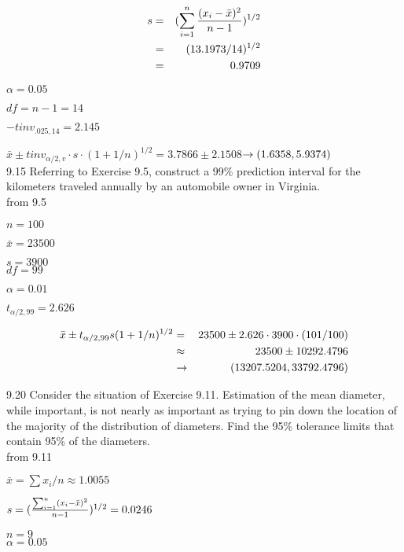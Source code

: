 \begin{eqnarray*}
s & = & (\sum^n_{i = 1} \frac{(x_i - \bar{x})^2}{n-1})^{1/2} \\
& = & (13.1973/14)^{1/2} \\
& = & 0.9709
\end{eqnarray*}

$\alpha = 0.05$

$df = n - 1 = 14$

$-tinv_{.025,14} = 2.145$

$\bar{x} \pm tinv_{\alpha/2,v} \cdot s \cdot (1 + 1/n)^{1/2} $$= 3.7866 \pm 2.1508 $$\rightarrow (1.6358, 5.9374)$ \\

9.15 Referring to Exercise 9.5, construct a 99\% prediction interval for the kilometers traveled annually by an automobile owner in Virginia. \\

from 9.5 

$n = 100$ 

$\bar{x} = 23500$

$s = 3900$ \\

$df = 99$ 

$\alpha = 0.01$

$t_{\alpha/2, 99} = 2.626$

\begin{eqnarray*}
\bar{x} \pm t_{\alpha/2,99} s (1 + 1/n)^{1/2} 
& = & 23500 \pm 2.626 \cdot 3900 \cdot (101/100) \\
& \approx & 23500 \pm 10292.4796 \\
& \rightarrow & (13207.5204, 33792.4796) 
\end{eqnarray*}

9.20  Consider the situation of Exercise 9.11. Estimation of the mean diameter, while important, is not nearly as important as trying to pin down the location of the majority of the distribution of diameters. Find the 95\% tolerance limits that contain 95\% of the diameters. \\

from 9.11

$\bar{x} = \sum x_i /n \approx 1.0055 $ 


$s = (\frac{\sum_{i=1}^n(x_i - \bar{x})^2}{n-1})^{1/2} = 0.0246$ 

$n = 9$  \\


$\alpha = 0.05 $

